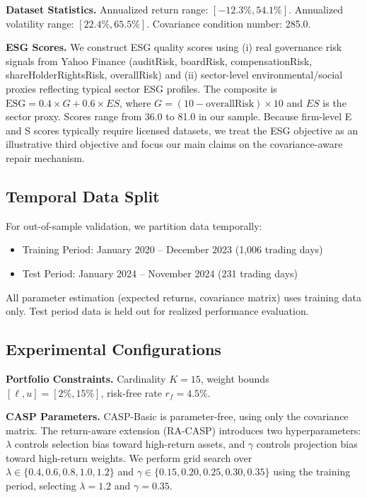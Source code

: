 \documentclass[10pt,twocolumn,a4paper]{article}
\begin{document}
\textbf{Dataset Statistics.} Annualized return range: $[-12.3\%, 54.1\%]$. Annualized volatility range: $[22.4\%, 65.5\%]$. Covariance condition number: 285.0. 

\textbf{ESG Scores.} We construct ESG quality scores using (i) real governance risk signals from Yahoo Finance (auditRisk, boardRisk, compensationRisk, shareHolderRightsRisk, overallRisk) and (ii) sector-level environmental/social proxies reflecting typical sector ESG profiles. The composite is $\text{ESG} = 0.4 \times G + 0.6 \times ES$, where $G = (10 - \text{overallRisk}) \times 10$ and $ES$ is the sector proxy. Scores range from 36.0 to 81.0 in our sample. Because firm-level E and S scores typically require licensed datasets, we treat the ESG objective as an illustrative third objective and focus our main claims on the covariance-aware repair mechanism.

\subsection{Temporal Data Split}

For out-of-sample validation, we partition data temporally:
\begin{itemize}
    \item Training Period: January 2020 -- December 2023 (1,006 trading days)
    \item Test Period: January 2024 -- November 2024 (231 trading days)
\end{itemize}
All parameter estimation (expected returns, covariance matrix) uses training data only. Test period data is held out for realized performance evaluation.

\subsection{Experimental Configurations}

\textbf{Portfolio Constraints.} Cardinality $K = 15$, weight bounds $[\ell, u] = [2\%, 15\%]$, risk-free rate $r_f = 4.5\%$.

\textbf{CASP Parameters.} CASP-Basic is parameter-free, using only the covariance matrix. The return-aware extension (RA-CASP) introduces two hyperparameters: $\lambda$ controls selection bias toward high-return assets, and $\gamma$ controls projection bias toward high-return weights. We perform grid search over $\lambda \in \{0.4, 0.6, 0.8, 1.0, 1.2\}$ and $\gamma \in \{0.15, 0.20, 0.25, 0.30, 0.35\}$ using the training period, selecting $\lambda = 1.2$ and $\gamma = 0.35$.
\end{document}
